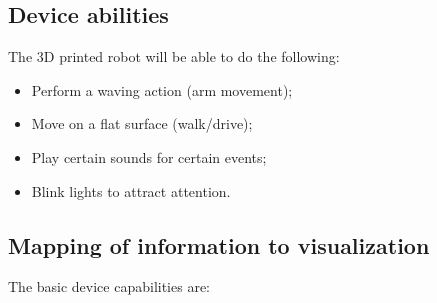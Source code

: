 \documentclass{sigchi-ext}
\begin{document}
\subsection{Device abilities}

The 3D printed robot will be able to do the following:
\begin{itemize}
  \item Perform a waving action (arm movement);
  \item Move on a flat surface (walk/drive);
  \item Play certain sounds for certain events;
  \item Blink lights to attract attention.
\end{itemize}

\subsection{Mapping of information to visualization}

The basic device capabilities are:
\end{document}
